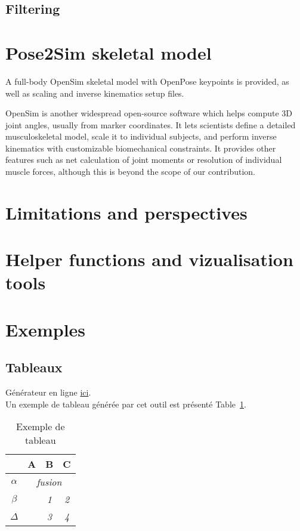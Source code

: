 \subsection{Filtering}
\blindtext


\section{Pose2Sim skeletal model}

A full-body OpenSim \cite{Delp2007,Seth2018} skeletal model with OpenPose keypoints is provided, as well as scaling and inverse kinematics setup files.

OpenSim is another widespread open-source software which helps compute 3D joint angles, usually from marker coordinates. It lets scientists define a detailed musculoskeletal model, scale it to individual subjects, and perform inverse kinematics with customizable biomechanical constraints. It provides other features such as net calculation of joint moments or resolution of individual muscle forces, although this is beyond the scope of our contribution.


\section{Limitations and perspectives}
\blindtext


\section{Helper functions and vizualisation tools}
\blindtext



\section{Exemples}

\FloatBarrier
\subsection{Tableaux}

Générateur en ligne \href{http://www.tablesgenerator.com/latex_tables}{ici}. \\

Un exemple de tableau générée par cet outil est présenté Table~\ref{tableau_exemple}.

\begin{table}[]
\centering
\begin{tabular}{c|c|c|c|}
\cline{2-4}
                               & \textbf{A}                 & \textbf{B} & \textbf{C} \\ \hline
\multicolumn{1}{|c|}{$\alpha$} & \multicolumn{3}{c|}{\textit{fusion}}                 \\ \hline
\multicolumn{1}{|c|}{$\beta$}  & \multirow{2}{*}{\textit{}} & \textit{1} & \textit{2} \\ \cline{1-1} \cline{3-4} 
\multicolumn{1}{|c|}{$\Delta$} &                            & \textit{3} & \textit{4} \\ \hline
\end{tabular}
\caption{Exemple de tableau}
\label{tableau_exemple}
\end{table}
